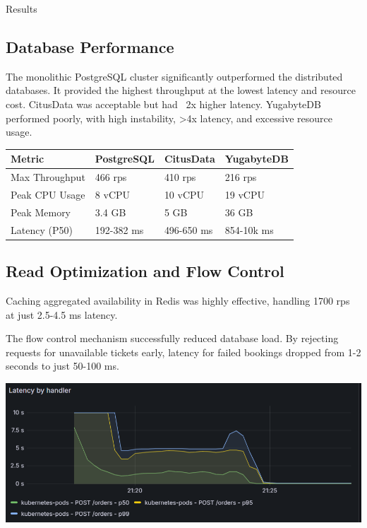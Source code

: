 \documentclass[a0,landscape]{config/poster/a0poster}
\newcommand{\postersection}[1]{%
  \begin{tcolorbox}[
    colback=IEEEblue,
    colframe=IEEEblue,
    fonttitle=\bfseries,
    coltext=white,
    sharp corners,
    boxrule=0pt,
    top=4pt,
    bottom=4pt,
    halign=center
  ]
    \large #1
  \end{tcolorbox}%
}
\begin{document}
\begin{multicols}{4}
    \postersection{Results}
    \subsection*{Database Performance}
    The monolithic PostgreSQL cluster significantly outperformed the distributed databases. It provided the highest throughput at the lowest latency and resource cost. CitusData was acceptable but had ~2x higher latency. YugabyteDB performed poorly, with high instability, >4x latency, and excessive resource usage.

    \begin{center}\vspace{0.5cm}
        \begin{tabular}{l l l l}
            \toprule
            \textbf{Metric} & \textbf{PostgreSQL} & \textbf{CitusData} & \textbf{YugabyteDB} \\
            \midrule
            Max Throughput  & 466 rps             & 410 rps            & 216 rps             \\
            Peak CPU Usage  & 8 vCPU              & 10 vCPU            & 19 vCPU             \\
            Peak Memory     & 3.4 GB              & 5 GB               & 36 GB               \\
            Latency (P50)   & 192-382 ms          & 496-650 ms         & 854-10k ms          \\
            \bottomrule
        \end{tabular}
    \end{center}\vspace{0.5cm}

    \subsection*{Read Optimization and Flow Control}
    Caching aggregated availability in Redis was highly effective, handling 1700 rps at just 2.5-4.5 ms latency.

    The flow control mechanism successfully reduced database load. By rejecting requests for unavailable tickets early, latency for failed bookings dropped from 1-2 seconds to just 50-100 ms.

    \begin{center}\vspace{0.5cm}
        \includegraphics[width=0.9\linewidth]{latency-nofc-pg-stress-0.png}
    \end{center}\vspace{0.5cm}


\end{multicols}
\end{document}
